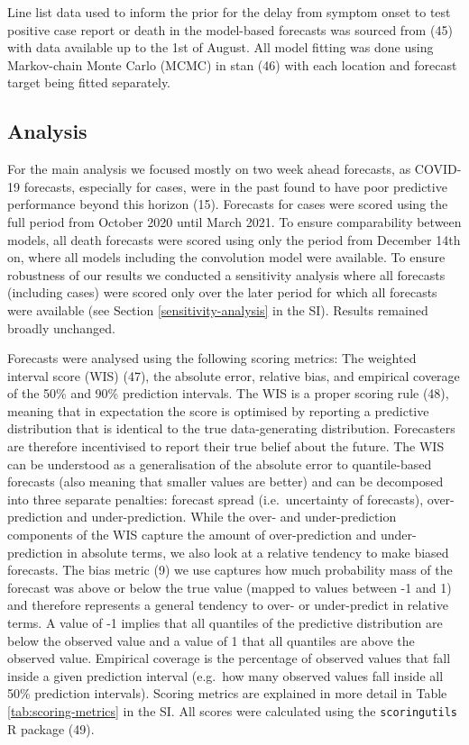 \documentclass[
]{article}
\begin{document}
Line list data used to inform the prior for the delay from symptom onset to test positive case report or death in the model-based forecasts was sourced from (45) with data available up to the 1st of August. All model fitting was done using Markov-chain Monte Carlo (MCMC) in stan (46) with each location and forecast target being fitted separately.

\hypertarget{analysis}{%
\subsection{Analysis}\label{analysis}}

For the main analysis we focused mostly on two week ahead forecasts, as COVID-19 forecasts, especially for cases, were in the past found to have poor predictive performance beyond this horizon (15). Forecasts for cases were scored using the full period from October 2020 until March 2021. To ensure comparability between models, all death forecasts were scored using only the period from December 14th on, where all models including the convolution model were available. To ensure robustness of our results we conducted a sensitivity analysis where all forecasts (including cases) were scored only over the later period for which all forecasts were available (see Section \ref{sensitivity-analysis} in the SI). Results remained broadly unchanged.

Forecasts were analysed using the following scoring metrics: The weighted interval score (WIS) (47), the absolute error, relative bias, and empirical coverage of the 50\% and 90\% prediction intervals. The WIS is a proper scoring rule (48), meaning that in expectation the score is optimised by reporting a predictive distribution that is identical to the true data-generating distribution. Forecasters are therefore incentivised to report their true belief about the future. The WIS can be understood as a generalisation of the absolute error to quantile-based forecasts (also meaning that smaller values are better) and can be decomposed into three separate penalties: forecast spread (i.e.~uncertainty of forecasts), over-prediction and under-prediction. While the over- and under-prediction components of the WIS capture the amount of over-prediction and under-prediction in absolute terms, we also look at a relative tendency to make biased forecasts. The bias metric (9) we use captures how much probability mass of the forecast was above or below the true value (mapped to values between -1 and 1) and therefore represents a general tendency to over- or under-predict in relative terms. A value of -1 implies that all quantiles of the predictive distribution are below the observed value and a value of 1 that all quantiles are above the observed value. Empirical coverage is the percentage of observed values that fall inside a given prediction interval (e.g.~how many observed values fall inside all 50\% prediction intervals). Scoring metrics are explained in more detail in Table \ref{tab:scoring-metrics} in the SI. All scores were calculated using the \texttt{scoringutils} R package (49).
\end{document}
